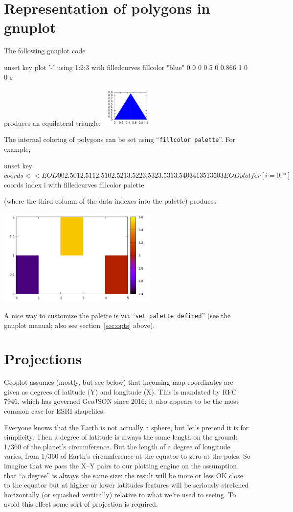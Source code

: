 \documentclass{article}
\newcommand{\myappendix}[1]{%
\addtocounter{appcount}{1}
\section{#1}}
\begin{document}
\myappendix{Representation of polygons in gnuplot}
\label{sec:gnuplot}

The
following \textsf{gnuplot} code
\begin{code}
  unset key
  plot '-' using 1:2:3 with filledcurves fillcolor "blue"
  0 0 0
  0.5 0 0.866
  1 0 0
  e
\end{code}
produces an equilateral triangle: \includegraphics[height=2cm]{triangle.pdf}

\medskip

The internal coloring of polygons can be set using ``\texttt{fillcolor
  palette}''. For example,
\begin{code}
unset key
$coords << EOD
0 0 2.5
0 1 2.5
1 1 2.5
1 0 2.5

2 1 3.5
2 2 3.5
3 2 3.5
3 1 3.5

4 0 3
4 1 3
5 1 3
5 0 3
EOD
plot for [i=0:*] $coords index i with filledcurves fillcolor palette
\end{code}
(where the third column of the data indexes into the palette) produces
\begin{center}
  \includegraphics[width=0.6\textwidth]{squares}
\end{center}

A nice way to customize the palette is via ``\texttt{set
  palette defined}'' (see the \textsf{gnuplot} manual; also see
section~\ref{sec:opts} above).

\clearpage
\myappendix{Projections}
\label{app:proj}

\textsf{Geoplot} assumes (mostly, but see below) that incoming map
coordinates are given as degrees of latitude (Y) and longitude
(X). This is mandated by RFC 7946, which has governed GeoJSON since
2016; it also appears to be the most common case for ESRI shapefiles.

Everyone knows that the Earth is not actually a sphere, but let's
pretend it is for simplicity. Then a degree of latitude is always the
same length on the ground: 1/360 of the planet's circumference. But
the length of a degree of longitude varies, from 1/360 of Earth's
circumference at the equator to zero at the poles. So imagine that we
pass the X--Y pairs to our plotting engine on the assumption that ``a
degree'' is always the same size: the result will be more or less OK
close to the equator but at higher or lower latitudes features will be
seriously stretched horizontally (or squashed vertically) relative to
what we're used to seeing. To avoid this effect some sort of
projection is required.
\end{document}
